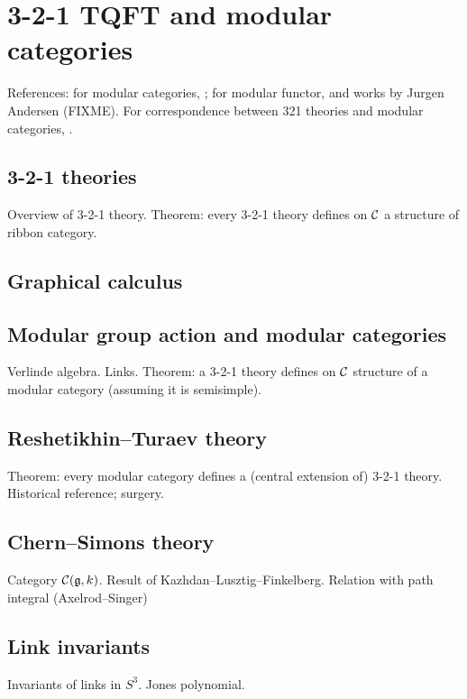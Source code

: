 \chapter{3-2-1 TQFT and modular categories}\label{c:321}

References: for modular categories, \cite[]{etingof-fusion};
for modular functor, \cite{bakalov-kirillov} and works by
Jurgen Andersen (FIXME). For correspondence between 321 theories
and modular categories, \cite{bdspv}.

\section{3-2-1 theories}\label{s:321-theories}
Overview of 3-2-1 theory. Theorem:
every 3-2-1 theory defines on $\mathcal{C}$ a structure of
ribbon category.

\section{Graphical calculus}\label{s:321-graphical}

\section{Modular group action and modular categories}\label{s:modular-group-action}
Verlinde algebra. Links.
Theorem: a 3-2-1 theory defines on $\mathcal{C}$ structure of a modular category
(assuming it is semisimple).

\section{Reshetikhin--Turaev theory}\label{s:rt-theory}
Theorem: every modular category defines a (central extension of) 3-2-1 theory.
Historical reference; surgery.

\section{Chern--Simons theory}\label{s:chern-simons}
Category $\mathcal{C}(\mathfrak{g}, k)$. Result of Kazhdan--Lusztig--Finkelberg. Relation with
path integral (Axelrod--Singer)

\section{Link invariants}\label{s:link-invariants}
Invariants of links in $S^3$. Jones polynomial.